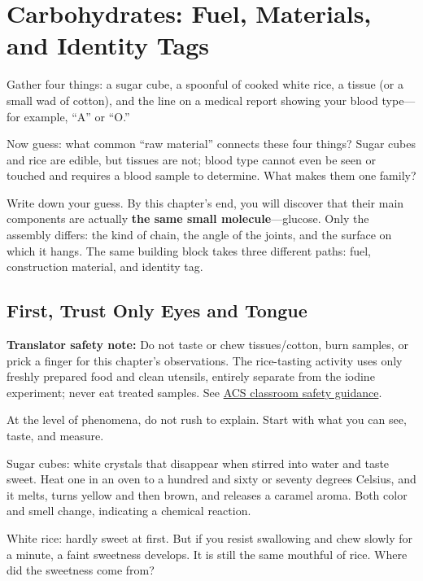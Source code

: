 \chapter{Carbohydrates: Fuel, Materials, and Identity Tags}

\begin{kaichang}
Gather four things: a sugar cube, a spoonful of cooked white rice, a tissue (or a small wad of cotton), and the line on a medical report showing your blood type---for example, ``A'' or ``O.''

Now guess: what common ``raw material'' connects these four things? Sugar cubes and rice are edible, but tissues are not; blood type cannot even be seen or touched and requires a blood sample to determine. What makes them one family?

Write down your guess. By this chapter's end, you will discover that their main components are actually \textbf{the same small molecule}---glucose. Only the assembly differs: the kind of chain, the angle of the joints, and the surface on which it hangs. The same building block takes three different paths: fuel, construction material, and identity tag.
\end{kaichang}

\section{First, Trust Only Eyes and Tongue}

\textbf{Translator safety note:} Do not taste or chew tissues/cotton, burn samples, or prick a finger for this chapter's observations. The rice-tasting activity uses only freshly prepared food and clean utensils, entirely separate from the iodine experiment; never eat treated samples. See \href{https://www.acs.org/content/dam/acsorg/about/governance/committees/chemicalsafety/safetypractices/safety-in-the-elementary-school-science-classroom.pdf}{ACS classroom safety guidance}.

At the level of phenomena, do not rush to explain. Start with what you can see, taste, and measure.

Sugar cubes: white crystals that disappear when stirred into water and taste sweet. Heat one in an oven to a hundred and sixty or seventy degrees Celsius, and it melts, turns yellow and then brown, and releases a caramel aroma. Both color and smell change, indicating a chemical reaction.

White rice: hardly sweet at first. But if you resist swallowing and chew slowly for a minute, a faint sweetness develops. It is still the same mouthful of rice. Where did the sweetness come from?


